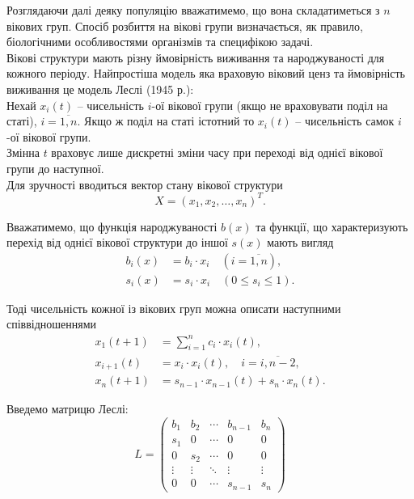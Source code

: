 Розглядаючи далі деяку популяцію вважатимемо, що вона складатиметься з $n$ вікових груп. Спосіб розбиття на вікові групи визначається, як правило, біологічними особливостями організмів та специфікою задачі. \\

Вікові структури мають різну ймовірність виживання та народжуваності для кожного періоду. Найпростіша модель яка враховую віковий ценз та ймовірність виживання це модель Леслі (1945 р.): \\

Нехай $x_i(t)$ -- чисельність $i$-ої вікової групи (якщо не враховувати поділ на статі), $i = \overline{1, n}$. Якщо ж поділ на статі істотний то $x_i(t)$ -- чисельність самок $i$-ої вікової групи. \\

Змінна $t$ враховує лише дискретні зміни часу при переході від однієї вікової групи до наступної. \\

Для зручності вводиться вектор стану вікової структури 
\begin{equation}
    X = \left(x_1, x_2, \ldots, x_n\right)^T.
\end{equation}

Вважатимемо, що функція народжуваності $b(x)$ та функції, що характеризують перехід від однієї вікової структури до іншої $s(x)$ мають вигляд 
\begin{align}
    b_i(x) &= b_i \cdot x_i \quad (i = \overline{1, n}), \\
    s_i(x) &= s_i \cdot x_i \quad (0 \le s_i \le 1).
\end{align}

Тоді чисельність кожної із вікових груп можна описати наступними співвідношеннями
\begin{align}
    x_1(t + 1) &= \sum_{i = 1}^n c_i \cdot x_i(t), \\
    x_{i + 1}(t) &= x_i \cdot x_i(t), \quad i = \overline{i, n - 2}, \\
    x_n(t + 1) &= s_{n - 1} \cdot x_{n - 1}(t) + s_n \cdot x_n(t).
\end{align}

Введемо матрицю Леслі:
\begin{equation}
    L = \begin{pmatrix} b_1 & b_2 & \cdots & b_{n - 1} & b_n \\ s_1 & 0 & \cdots & 0 & 0 \\ 0 & s_2 & \cdots & 0 & 0 \\ \vdots & \vdots & \ddots & \vdots & \vdots \\ 0 & 0 & \cdots & s_{n - 1} & s_n \end{pmatrix}
\end{equation}

